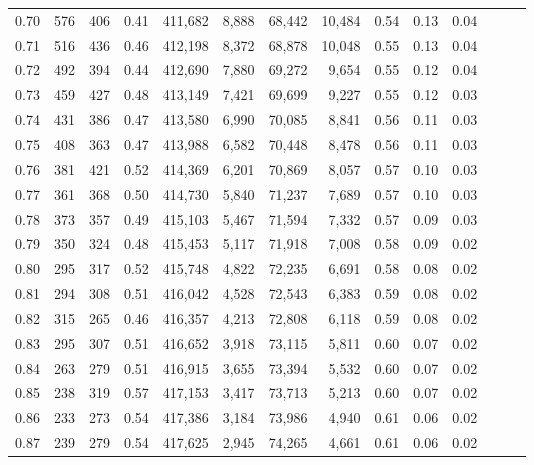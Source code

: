 \begin{tabular}{rrrrrrrrrrrrrr}
0.70 &     576 &    406 &  0.41 &  411,682 &    8,888 &  68,442 &  10,484 &  0.54 &  0.13 &      0.04 \\
0.71 &     516 &    436 &  0.46 &  412,198 &    8,372 &  68,878 &  10,048 &  0.55 &  0.13 &      0.04 \\
0.72 &     492 &    394 &  0.44 &  412,690 &    7,880 &  69,272 &   9,654 &  0.55 &  0.12 &      0.04 \\
0.73 &     459 &    427 &  0.48 &  413,149 &    7,421 &  69,699 &   9,227 &  0.55 &  0.12 &      0.03 \\
0.74 &     431 &    386 &  0.47 &  413,580 &    6,990 &  70,085 &   8,841 &  0.56 &  0.11 &      0.03 \\
0.75 &     408 &    363 &  0.47 &  413,988 &    6,582 &  70,448 &   8,478 &  0.56 &  0.11 &      0.03 \\
0.76 &     381 &    421 &  0.52 &  414,369 &    6,201 &  70,869 &   8,057 &  0.57 &  0.10 &      0.03 \\
0.77 &     361 &    368 &  0.50 &  414,730 &    5,840 &  71,237 &   7,689 &  0.57 &  0.10 &      0.03 \\
0.78 &     373 &    357 &  0.49 &  415,103 &    5,467 &  71,594 &   7,332 &  0.57 &  0.09 &      0.03 \\
0.79 &     350 &    324 &  0.48 &  415,453 &    5,117 &  71,918 &   7,008 &  0.58 &  0.09 &      0.02 \\
0.80 &     295 &    317 &  0.52 &  415,748 &    4,822 &  72,235 &   6,691 &  0.58 &  0.08 &      0.02 \\
0.81 &     294 &    308 &  0.51 &  416,042 &    4,528 &  72,543 &   6,383 &  0.59 &  0.08 &      0.02 \\
0.82 &     315 &    265 &  0.46 &  416,357 &    4,213 &  72,808 &   6,118 &  0.59 &  0.08 &      0.02 \\
0.83 &     295 &    307 &  0.51 &  416,652 &    3,918 &  73,115 &   5,811 &  0.60 &  0.07 &      0.02 \\
0.84 &     263 &    279 &  0.51 &  416,915 &    3,655 &  73,394 &   5,532 &  0.60 &  0.07 &      0.02 \\
0.85 &     238 &    319 &  0.57 &  417,153 &    3,417 &  73,713 &   5,213 &  0.60 &  0.07 &      0.02 \\
0.86 &     233 &    273 &  0.54 &  417,386 &    3,184 &  73,986 &   4,940 &  0.61 &  0.06 &      0.02 \\
0.87 &     239 &    279 &  0.54 &  417,625 &    2,945 &  74,265 &   4,661 &  0.61 &  0.06 &      0.02 \\

\end{tabular}
